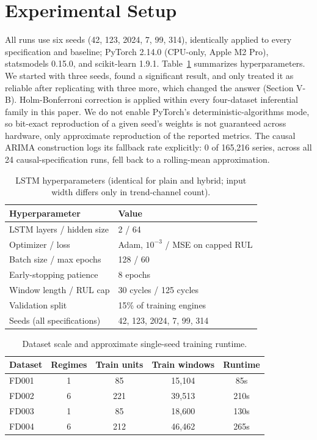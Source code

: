\documentclass[conference]{IEEEtran}
\begin{document}
\section{Experimental Setup}
All runs use six seeds (42, 123, 2024, 7, 99, 314), identically applied to every specification and baseline; PyTorch 2.14.0 (CPU-only, Apple M2 Pro), statsmodels 0.15.0, and scikit-learn 1.9.1. Table~\ref{tab:hyperparams} summarizes hyperparameters. We started with three seeds, found a significant result, and only treated it as reliable after replicating with three more, which changed the answer (Section V-B). Holm-Bonferroni correction is applied within every four-dataset inferential family in this paper. We do not enable PyTorch's deterministic-algorithms mode, so bit-exact reproduction of a given seed's weights is not guaranteed across hardware, only approximate reproduction of the reported metrics. The causal ARIMA construction logs its fallback rate explicitly: 0 of 165{,}216 series, across all 24 causal-specification runs, fell back to a rolling-mean approximation.

\begin{table}[t]
\centering
\caption{LSTM hyperparameters (identical for plain and hybrid; input width differs only in trend-channel count).}
\label{tab:hyperparams}
\footnotesize
\begin{tabular}{ll}
\toprule
Hyperparameter & Value \\
\midrule
LSTM layers / hidden size & 2 / 64 \\
Optimizer / loss & Adam, $10^{-3}$ / MSE on capped RUL \\
Batch size / max epochs & 128 / 60 \\
Early-stopping patience & 8 epochs \\
Window length / RUL cap & 30 cycles / 125 cycles \\
Validation split & 15\% of training engines \\
Seeds (all specifications) & 42, 123, 2024, 7, 99, 314 \\
\bottomrule
\end{tabular}
\end{table}

\begin{table}[t]
\centering
\caption{Dataset scale and approximate single-seed training runtime.}
\label{tab:meta}
\footnotesize
\begin{tabular}{lcccc}
\toprule
Dataset & Regimes & Train units & Train windows & Runtime \\
\midrule
FD001 & 1 & 85 & 15{,}104 & 85s \\
FD002 & 6 & 221 & 39{,}513 & 210s \\
FD003 & 1 & 85 & 18{,}600 & 130s \\
FD004 & 6 & 212 & 46{,}462 & 265s \\
\bottomrule
\end{tabular}
\end{table}
\end{document}
